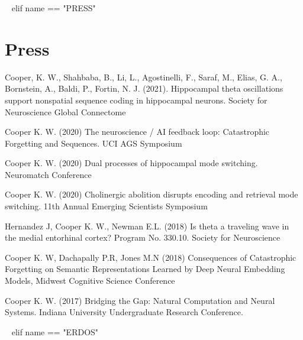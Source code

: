 ~{ elif name == "PRESS" }~

\section{Press}

\begin{etaremune}[itemindent=-\bibhang, topsep=0pt,
				   itemsep=\bibsep,partopsep=0pt,parsep=0pt,leftmargin={\bibhang+\widthof{[999]}}] 
    \item  Cooper, K. W., Shahbaba, B., Li, L., Agostinelli, F., Saraf, M., Elias, G. A., Bornstein, A., Baldi, P.,  Fortin, N. J. (2021). Hippocampal theta oscillations support nonspatial sequence coding in hippocampal neurons. Society for Neuroscience Global Connectome


    \item  Cooper K. W. (2020) The neuroscience / AI feedback loop: Catastrophic Forgetting and Sequences. UCI AGS Symposium


    \item Cooper K. W. (2020) Dual processes of hippocampal mode switching. Neuromatch Conference

    \item Cooper K. W. (2020) Cholinergic abolition disrupts encoding and retrieval mode switching. 11th Annual Emerging Scientists Symposium

    \item Hernandez J, Cooper K. W., Newman E.L. (2018) Is theta a traveling wave in the medial entorhinal cortex? Program No. 330.10. Society for Neuroscience

    \item Cooper K. W, Dachapally P.R, Jones M.N (2018) Consequences of Catastrophic Forgetting on Semantic Representations Learned by Deep Neural Embedding Models, Midwest Cognitive Science Conference

    \item Cooper K. W. (2017) Bridging the Gap: Natural Computation and Neural Systems. Indiana University Undergraduate Research Conference.

\end{etaremune}





~{ elif name == "ERDOS" }~

